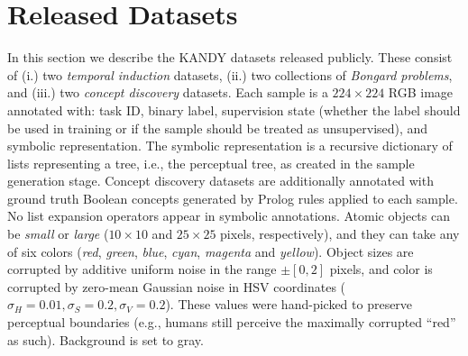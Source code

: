 \section{Released Datasets}\label{kandy:sec:curricula}
In this section we describe the \textsc{KANDY} datasets released publicly. These consist of (i.) two \textit{temporal induction} datasets, (ii.) two collections of \textit{Bongard problems}, and (iii.) two \textit{concept discovery} datasets.
%
Each sample is a $224 \times 224$ RGB image annotated with: task ID, binary label, supervision state (whether the label should be used in training or if the sample should be treated as unsupervised), and symbolic representation. %
The symbolic representation is a recursive dictionary of lists representing a tree, i.e., the perceptual tree, as created in the sample generation stage. %
Concept discovery datasets are additionally annotated with ground truth Boolean concepts generated by Prolog rules applied to each sample.
No list expansion operators appear in symbolic annotations.
%
Atomic objects can be {\it small} or {\it large} ($10 \times 10$ and $25 \times 25$ pixels, respectively), and they can take any of six colors ({\it red}, {\it green}, {\it blue}, {\it cyan}, {\it magenta} and {\it yellow}). Object sizes are corrupted by additive uniform noise in the range $\pm[0, 2]$ pixels, and color is corrupted by zero-mean Gaussian noise in HSV coordinates ($\sigma_H = 0.01, \sigma_S = 0.2, \sigma_V = 0.2$). These values were hand-picked to preserve perceptual boundaries (e.g., humans still perceive the maximally corrupted ``red'' as such). Background is set to gray.


